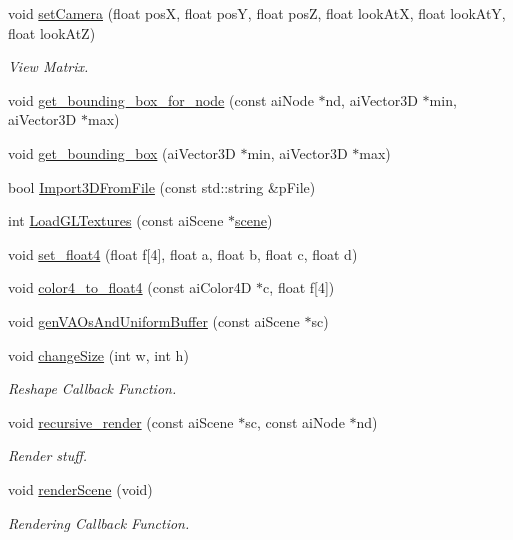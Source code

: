 \begin{DoxyCompactItemize}
void \hyperlink{model_8cu_a306a8190e29c6adc6e47c9c3b23cbfec}{set\-Camera} (float pos\-X, float pos\-Y, float pos\-Z, float look\-At\-X, float look\-At\-Y, float look\-At\-Z)
\begin{DoxyCompactList}\small\item\em View Matrix. \end{DoxyCompactList}\item 
void \hyperlink{model_8cu_a0fa53e006e46a19c09ddd85bd96092bd}{get\-\_\-bounding\-\_\-box\-\_\-for\-\_\-node} (const ai\-Node $\ast$nd, ai\-Vector3\-D $\ast$min, ai\-Vector3\-D $\ast$max)
\item 
void \hyperlink{model_8cu_a8f5b774db8e436e3654c9621c4b41874}{get\-\_\-bounding\-\_\-box} (ai\-Vector3\-D $\ast$min, ai\-Vector3\-D $\ast$max)
\item 
bool \hyperlink{model_8cu_a60b2175b933b3082dda62bf12fafa458}{Import3\-D\-From\-File} (const std\-::string \&p\-File)
\item 
int \hyperlink{model_8cu_aae09916d7c50132fd0830999049f3936}{Load\-G\-L\-Textures} (const ai\-Scene $\ast$\hyperlink{model_8cu_a7146d7f6682223a83b571071845d75e9}{scene})
\item 
void \hyperlink{model_8cu_a0a0e3b406aa4eab4670257833054df21}{set\-\_\-float4} (float f\mbox{[}4\mbox{]}, float a, float b, float c, float d)
\item 
void \hyperlink{model_8cu_ad0cbb7e78e2936c67729f2d70e2b2159}{color4\-\_\-to\-\_\-float4} (const ai\-Color4\-D $\ast$c, float f\mbox{[}4\mbox{]})
\item 
void \hyperlink{model_8cu_ae70d02ac862e66e27e3166038bd9d94b}{gen\-V\-A\-Os\-And\-Uniform\-Buffer} (const ai\-Scene $\ast$sc)
\item 
void \hyperlink{model_8cu_a33e20b37682a0492a9e95d13bef17f02}{change\-Size} (int w, int h)
\begin{DoxyCompactList}\small\item\em Reshape Callback Function. \end{DoxyCompactList}\item 
void \hyperlink{model_8cu_a864fafd1dcefb67b0dec7c6b6b6f5c96}{recursive\-\_\-render} (const ai\-Scene $\ast$sc, const ai\-Node $\ast$nd)
\begin{DoxyCompactList}\small\item\em Render stuff. \end{DoxyCompactList}\item 
void \hyperlink{model_8cu_a2a96aed746d13d9b42d7888e156045f6}{render\-Scene} (void)
\begin{DoxyCompactList}\small\item\em Rendering Callback Function. \end{DoxyCompactList}\item 

\end{DoxyCompactItemize}
